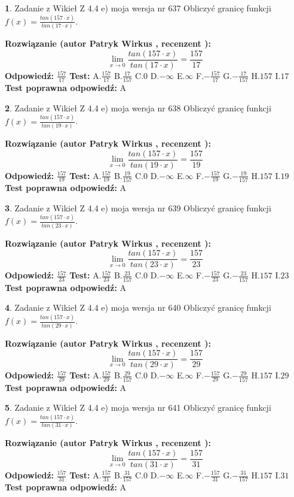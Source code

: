 \documentclass[12pt, a4paper]{article}
\theoremstyle{definition} %
\newtheorem{zad}{}
\newcommand{\zadStart}[1]{\begin{zad}#1\newline}
\newcommand{\zadStop}{\end{zad}}
\newcommand{\rozwStart}[2]{\noindent \textbf{Rozwiązanie (autor #1 , recenzent #2): }\newline}
\newcommand{\rozwStop}{\newline}
\newcommand{\odpStart}{\noindent \textbf{Odpowiedź:}\newline}
\newcommand{\odpStop}{\newline}
\newcommand{\testStart}{\noindent \textbf{Test:}\newline}
\newcommand{\testStop}{\newline}
\newcommand{\kluczStart}{\noindent \textbf{Test poprawna odpowiedź:}\newline}
\newcommand{\kluczStop}{\newline}
\begin{document}
\zadStart{Zadanie z Wikieł Z 4.4 e) moja wersja nr 637}
Obliczyć granicę funkcji $f(x)=\frac{tan(157\cdot x)}{tan(17\cdot x)}$.
\zadStop
\rozwStart{Patryk Wirkus}{}
$$\lim\limits_{x\to 0}\frac{tan(157\cdot x)}{tan(17\cdot x)}=
\frac{157}{17}$$
\rozwStop
\odpStart
$\frac{157}{17}$
\odpStop
\testStart
A.$\frac{157}{17}$
B.$\frac{17}{157}$
C.$0$
D.$-\infty$
E.$\infty$
F.$-\frac{157}{17}$
G.$-\frac{17}{157}$
H.$157$
I.$17$
\testStop
\kluczStart
A
\kluczStop



\zadStart{Zadanie z Wikieł Z 4.4 e) moja wersja nr 638}
Obliczyć granicę funkcji $f(x)=\frac{tan(157\cdot x)}{tan(19\cdot x)}$.
\zadStop
\rozwStart{Patryk Wirkus}{}
$$\lim\limits_{x\to 0}\frac{tan(157\cdot x)}{tan(19\cdot x)}=
\frac{157}{19}$$
\rozwStop
\odpStart
$\frac{157}{19}$
\odpStop
\testStart
A.$\frac{157}{19}$
B.$\frac{19}{157}$
C.$0$
D.$-\infty$
E.$\infty$
F.$-\frac{157}{19}$
G.$-\frac{19}{157}$
H.$157$
I.$19$
\testStop
\kluczStart
A
\kluczStop



\zadStart{Zadanie z Wikieł Z 4.4 e) moja wersja nr 639}
Obliczyć granicę funkcji $f(x)=\frac{tan(157\cdot x)}{tan(23\cdot x)}$.
\zadStop
\rozwStart{Patryk Wirkus}{}
$$\lim\limits_{x\to 0}\frac{tan(157\cdot x)}{tan(23\cdot x)}=
\frac{157}{23}$$
\rozwStop
\odpStart
$\frac{157}{23}$
\odpStop
\testStart
A.$\frac{157}{23}$
B.$\frac{23}{157}$
C.$0$
D.$-\infty$
E.$\infty$
F.$-\frac{157}{23}$
G.$-\frac{23}{157}$
H.$157$
I.$23$
\testStop
\kluczStart
A
\kluczStop



\zadStart{Zadanie z Wikieł Z 4.4 e) moja wersja nr 640}
Obliczyć granicę funkcji $f(x)=\frac{tan(157\cdot x)}{tan(29\cdot x)}$.
\zadStop
\rozwStart{Patryk Wirkus}{}
$$\lim\limits_{x\to 0}\frac{tan(157\cdot x)}{tan(29\cdot x)}=
\frac{157}{29}$$
\rozwStop
\odpStart
$\frac{157}{29}$
\odpStop
\testStart
A.$\frac{157}{29}$
B.$\frac{29}{157}$
C.$0$
D.$-\infty$
E.$\infty$
F.$-\frac{157}{29}$
G.$-\frac{29}{157}$
H.$157$
I.$29$
\testStop
\kluczStart
A
\kluczStop



\zadStart{Zadanie z Wikieł Z 4.4 e) moja wersja nr 641}
Obliczyć granicę funkcji $f(x)=\frac{tan(157\cdot x)}{tan(31\cdot x)}$.
\zadStop
\rozwStart{Patryk Wirkus}{}
$$\lim\limits_{x\to 0}\frac{tan(157\cdot x)}{tan(31\cdot x)}=
\frac{157}{31}$$
\rozwStop
\odpStart
$\frac{157}{31}$
\odpStop
\testStart
A.$\frac{157}{31}$
B.$\frac{31}{157}$
C.$0$
D.$-\infty$
E.$\infty$
F.$-\frac{157}{31}$
G.$-\frac{31}{157}$
H.$157$
I.$31$
\testStop
\kluczStart
A
\kluczStop
\end{document}
